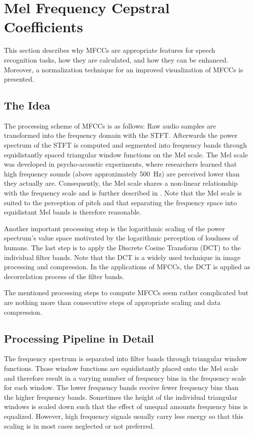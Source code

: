 
\section{Mel Frequency Cepstral Coefficients}\label{sec:signal_mfcc}
This section describes why MFCCs are appropriate features for speech recognition tasks, how they are calculated, and how they can be enhanced.
Moreover, a normalization technique for an improved visualization of MFCCs is presented.



\subsection{The Idea}
The processing scheme of MFCCs \cite{Davis1980MFCC} is as follows:
Raw audio samples are transformed into the frequency domain with the STFT.
Afterwards the power spectrum of the STFT is computed and segmented into frequency bands through equidistantly spaced triangular window functions on the Mel scale.
The Mel scale was developed in psycho-acoustic experiments, where researchers learned that high frequency sounds (above approximately \SI{500}{\hertz}) are perceived lower than they actually are.
Consequently, the Mel scale shares a non-linear relationship with the frequency scale and is further described in .
Note that the Mel scale is suited to the perception of pitch and that separating the frequency space into equidistant Mel bands is therefore reasonable.

Another important processing step is the logarithmic scaling of the power spectrum's value space motivated by the logarithmic perception of loudness of humans.
The last step is to apply the Discrete Cosine Transform (DCT) to the individual filter bands.
Note that the DCT is a widely used technique in image processing and compression.
In the applications of MFCCs, the DCT is applied as decorrelation process of the filter bands.

The mentioned processing steps to compute MFCCs seem rather complicated but are nothing more than consecutive steps of appropriate scaling and data compression.



\subsection{Processing Pipeline in Detail}\label{sec:signal_mfcc_pipeline}
The frequency spectrum is separated into filter bands through triangular window functions.
Those window functions are equidistantly placed onto the Mel scale and therefore result in a varying number of frequency bins in the frequency scale for each window.
The lower frequency bands receive fewer frequency bins than the higher frequency bands.
Sometimes the height of the individual triangular windows is scaled down such that the effect of unequal amounts frequency bins is equalized.
However, high frequency signals usually carry less energy so that this scaling is in most cases neglected or not preferred.


